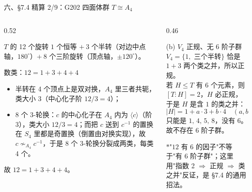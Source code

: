 \documentclass[aspectratio=169,10pt,fontset=none]{ctexbeamer}
\newcommand{\starpt}{\textcolor{accent}{\bfseries$\ast$}}
\begin{document}
\begin{frame}[t]{六、\S7.4 精算 2/9：G202 四面体群 $T\cong A_4$}
  \begin{columns}[T,onlytextwidth]
    \begin{column}{0.52\textwidth}
      \begin{block}{\footnotesize $T$ 的 12 个旋转}
        \scriptsize
        $1$ 个恒等 $+\ 3$ 个半转（对边中点轴，$180^\circ$）$+\ 8$ 个三阶旋转（顶点轴，$\pm120^\circ$）。
      \end{block}
      \begin{block}{\footnotesize 数类：$12=1+3+4+4$}
        \scriptsize
        \begin{itemize}\setlength{\itemsep}{1pt}
          \item 半转在 4 个顶点上是双对换，$A_4$ 里三者共轭，类大小 $3$（中心化子阶 $12/3=4$）；
          \item 8 个 3-轮换：$c$ 的中心化子在 $A_4$ 内为 $\langle c\rangle$（阶 3），类大小 $12/3=4$；而把 $c$ 送到 $c^{-1}$ 的置换在 $S_4$ 里都是奇置换（倒置由对换实现），故 $c\nsim_{A_4}c^{-1}$，于是 8 个 3-轮换分裂成两类，每类 4 个。
        \end{itemize}
        故 $12=1+3+4+4$。
      \end{block}
    \end{column}
    \begin{column}{0.46\textwidth}
      \begin{exampleblock}{\footnotesize (b) $V_4$ 正规、无 6 阶子群}
        \scriptsize
        $V_4=\{1,$ 三个半转$\}$ 恰是 $1+3$ 两个类之并，所以正规。\\
        若 $H\le T$ 有 6 个元素，则 $[T:H]=2$，$H$ 必正规，于是 $H$ 是含 $1$ 的类之并：
        \[ |H|=1+a\cdot3+b\cdot4\quad(a,b\in\{0,1\}), \]
        只能是 $1,\,4,\,5,\,8$，没有 $6$。故不存在 6 阶子群。
      \end{exampleblock}
      \footnotesize\color{ink!80}
      \starpt "$12$ 有 6 的因子"不等于"有 6 阶子群"；这里用"指数 2 $\Rightarrow$ 正规 $\Rightarrow$ 类之并"反证，是 \S7.4 的通用招法。
    \end{column}
  \end{columns}
\end{frame}
\end{document}
